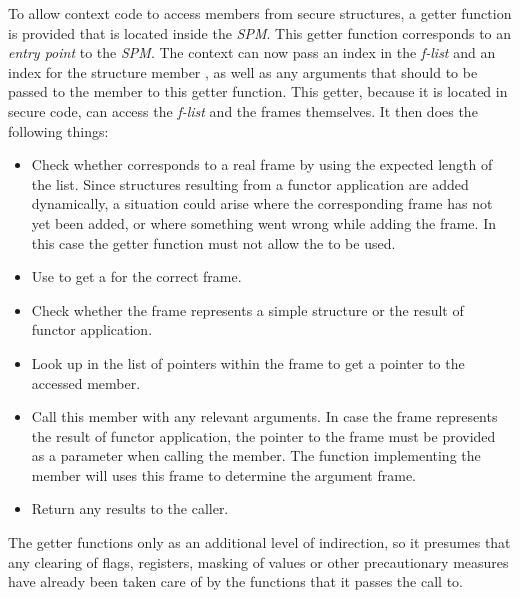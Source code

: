 To allow context code to access members from secure structures, a getter function is provided that is located inside the \emph{SPM}.
This getter function corresponds to an \emph{entry point} to the \emph{SPM}.
The context can now pass an index in the \emph{f-list}  and an index for the structure member , as well as any arguments that should to be passed to the member to this getter function.
This getter, because it is located in secure code, can access the \emph{f-list} and the frames themselves.
It then does the following things:
\begin{itemize}
\item Check whether  corresponds to a real frame by using the expected length of the list.
Since structures resulting from a functor application are added dynamically, a situation could arise where the corresponding frame has not yet been added, or where something went wrong while adding the frame.
In this case the getter function must not allow the  to be used.
\item Use  to get a  for the correct frame.
\item Check whether the frame represents a simple structure or the result of functor application.
\item Look up  in the list of pointers within the frame to get a pointer to the accessed member.
\item Call this member with any relevant arguments.
In case the frame represents the result of functor application, the pointer to the frame must be provided as a parameter when calling the member.
The function implementing the member will uses this frame to determine the argument frame.
\item Return any results to the caller.
\end{itemize}

The getter functions only as an additional level of indirection, so it presumes that any clearing of flags, registers, masking of values or other precautionary measures have already been taken care of by the functions that it passes the call to.

